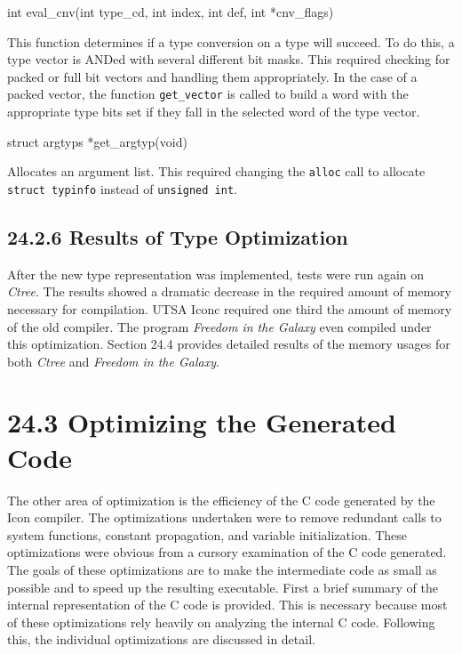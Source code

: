 {\ttfamily\mdseries
int eval\_cnv(int type\_cd, int index, int def, int *cnv\_flags)}

This function determines if a type conversion on a type will
succeed. To do this, a type vector is ANDed with several different bit
masks. This required checking for packed or full bit vectors and
handling them appropriately. In the case of a packed vector, the
function \texttt{get\_vector} is called to build a word with the
appropriate type bits set if they fall in the selected word of the
type vector.

{\ttfamily\mdseries
struct argtyps *get\_argtyp(void)}

Allocates an argument list. This required changing the
\texttt{alloc} call to allocate \texttt{struct typinfo} instead of
\texttt{unsigned int}.

\subsection[24.2.6 Results of Type Optimization]{24.2.6 Results of Type Optimization}

After the new type representation was implemented, tests were run
again on \textit{Ctree}. The results showed a dramatic decrease in the
required amount of memory necessary for compilation. UTSA Iconc
required one third the amount of memory of the old compiler. The
program \textit{Freedom in the Galaxy} even compiled under this
optimization. Section 24.4 provides detailed results of the memory
usages for both \textit{Ctree} and \textit{Freedom in the Galaxy}.

\section[24.3 Optimizing the Generated Code]{24.3 Optimizing the Generated Code}

The other area of optimization is the efficiency of the C code
generated by the Icon compiler. The optimizations undertaken were to
remove redundant calls to system functions, constant propagation, and
variable initialization. These optimizations were obvious from a
cursory examination of the C code generated. The goals of these
optimizations are to make the intermediate code as small as possible
and to speed up the resulting executable. First a brief summary of
the internal representation of the C code is provided. This is
necessary because most of these optimizations rely heavily on
analyzing the internal C code. Following this, the individual
optimizations are discussed in detail.

